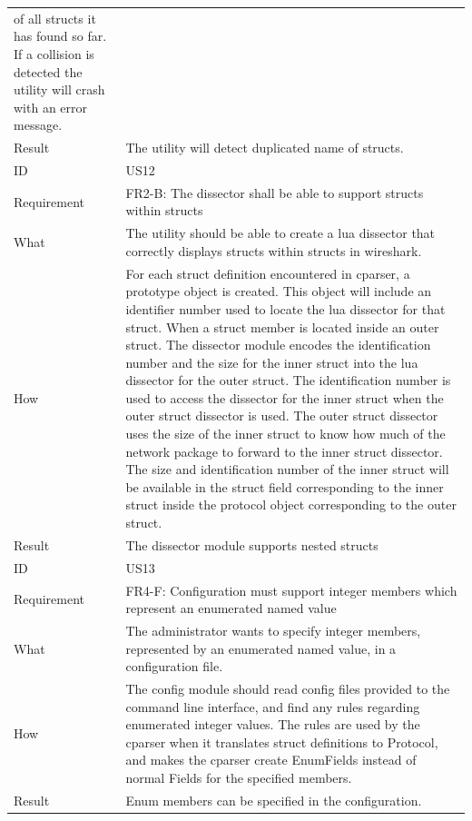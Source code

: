 \begin{table}[htbp]
{\begin{tabularx}{1.2\textwidth}{l X}
		of all \glspl{struct} it has found so far. If a collision is detected the \gls{utility} will crash with an error message. \\
	Result & The \gls{utility} will detect duplicated name of \glspl{struct}. \\
	\midrule
	ID & US12 \\
	Requirement & FR2-B: The \gls{dissector} shall be able to support \glspl{struct} within \glspl{struct} \\
	What & The \gls{utility} should be able to create a \Gls{lua} \gls{dissector} that correctly
	displays \glspl{struct} within \glspl{struct} in \Gls{wireshark}. \\
	How & For each \gls{struct} definition encountered in cparser, a prototype object is created. This object will include an 	identifier number used to locate
		the \Gls{lua} \gls{dissector} for that \gls{struct}. When a \gls{struct} \gls{member} is located inside an outer \gls{struct}. The \gls{dissector} module encodes the identification number 
		and the size for the inner \gls{struct} into the \Gls{lua} \gls{dissector} for the outer \gls{struct}. The identification number is used to access the \gls{dissector} for the inner
		\gls{struct} when the outer \gls{struct} \gls{dissector} is used. The outer \gls{struct} \gls{dissector} uses the size of the inner \gls{struct} to know how much of the network package
		to forward to the inner \gls{struct} \gls{dissector}. The size and identification number of the inner \gls{struct} will be available in the \gls{struct} field corresponding to
		the inner \gls{struct} inside the \gls{protocol} object corresponding to the outer \gls{struct}.  \\
	Result & The \gls{dissector} module supports nested \glspl{struct} \\
	\midrule
	ID & US13 \\
	Requirement & FR4-F: Configuration must support integer \glspl{member} which represent an enumerated named value \\
	What & The administrator wants to specify integer \glspl{member}, represented by an enumerated named value, in a configuration file. \\
	How & The config module should read config files provided to the command line interface, and find any rules regarding enumerated integer values.
		The rules are used by the cparser when it translates 	\gls{struct} definitions to Protocol, and makes the cparser create EnumFields instead of normal
		Fields for the specified \glspl{member}. \\
	Result & Enum \glspl{member} can be specified in the configuration. \\
	\bottomrule
\end{tabularx}}
\end{table}

